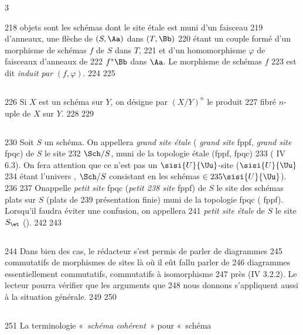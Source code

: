 3	\documentclass[10pt]{../fichiers-configuration-latex/smfart}
\begin{document}
   218	objets sont les schémas dont le site étale est muni d'un faisceau
   219	d'anneaux, une flèche de $(S,\Aa)$ dans $(T,\Bb)$
   220	étant un couple formé d'un morphisme de schémas $f$ de $S$ dans $T$,
   221	et d'un homomorphisme $\varphi$ de faisceaux d'anneaux de
   222	$f^{\ast}\Bb$ dans $\Aa$. Le morphisme de schémas $f$
   223	est dit \emph{induit par} $(f,\varphi)$.
   224	
   225	\subsection{}
   226	Si $X$ est un schéma sur $Y$, on désigne par $(X/Y)^n$ le produit
   227	fibré $n$-uple de $X$ sur $Y$.
   228	
   229	\subsection{}
   230	Soit $S$ un schéma. On appellera \emph{grand site étale} (	\emph{grand site} fppf, \resp \emph{grand site} fpqc) de $S$ le site
   232	$\Sch/{S}$, muni de la topologie étale (\resp fppf, \resp fpqc)
   233	( IV 6.3). On fera attention que ce n'est pas un $\sisi{U}{\Uu}$-site ($\sisi{U}{\Uu}$
   234	étant l'univers , $\Sch/{S}$ consistant en les schémas $\in
   235	\sisi{U}{\Uu}$).
   236	
   237	On\pageoriginale appelle \emph{petit site} fpqc (\resp \emph{petit
   238	  site} fppf) de $S$ le site des schémas plats sur $S$ (\resp plats de
   239	  présentation finie) muni de la topologie fpqc (	  fppf). Lorsqu'il faudra éviter une confusion, on appellera
   241	  \emph{petit site étale} de $S$ le site $S_{\et}$ ().
   242	
   243	\subsection{}
   244	Dans bien des cas, le rédacteur s'est permis de parler de diagrammes
   245	commutatifs de morphismes de sites là où il eût fallu parler de
   246	diagrammes essentiellement commutatifs, \ie commutatifs à isomorphisme
   247	près (\cf IV 3.2.2). Le lecteur pourra vérifier que les arguments que
   248	nous donnons s'appliquent aussi à la situation générale.
   249	
   250	\subsection{}
   251	La terminologie « \emph{schéma cohérent} »  pour « schéma
\end{document}
